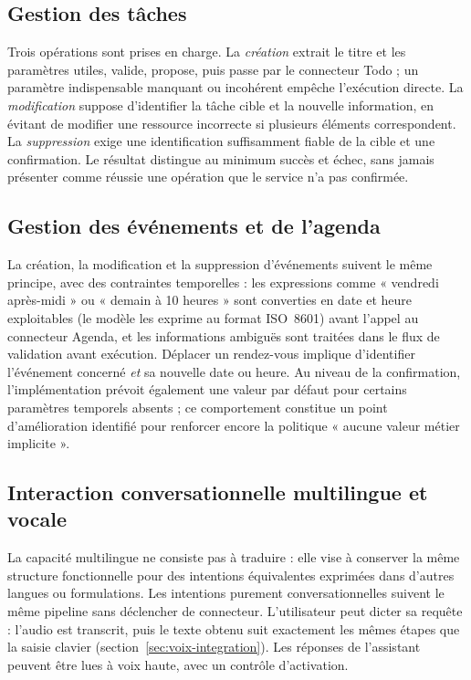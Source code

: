 \documentclass[11pt,a4paper,openany,oneside]{report}
\begin{document}
\subsection{Gestion des tâches}
Trois opérations sont prises en charge. La \emph{création} extrait le titre et les paramètres utiles, valide, propose, puis passe par le connecteur Todo ; un paramètre indispensable manquant ou incohérent empêche l'exécution directe. La \emph{modification} suppose d'identifier la tâche cible et la nouvelle information, en évitant de modifier une ressource incorrecte si plusieurs éléments correspondent. La \emph{suppression} exige une identification suffisamment fiable de la cible et une confirmation. Le résultat distingue au minimum succès et échec, sans jamais présenter comme réussie une opération que le service n'a pas confirmée.

\subsection{Gestion des événements et de l'agenda}
La création, la modification et la suppression d'événements suivent le même principe, avec des contraintes temporelles : les expressions comme « vendredi après-midi » ou « demain à 10 heures » sont converties en date et heure exploitables (le modèle les exprime au format ISO~8601) avant l'appel au connecteur Agenda, et les informations ambiguës sont traitées dans le flux de validation avant exécution. Déplacer un rendez-vous implique d'identifier l'événement concerné \emph{et} sa nouvelle date ou heure. Au niveau de la confirmation, l'implémentation prévoit également une valeur par défaut pour certains paramètres temporels absents ; ce comportement constitue un point d'amélioration identifié pour renforcer encore la politique « aucune valeur métier implicite ».

\subsection{Interaction conversationnelle multilingue et vocale}
La capacité multilingue ne consiste pas à traduire : elle vise à conserver la même structure fonctionnelle pour des intentions équivalentes exprimées dans d'autres langues ou formulations. Les intentions purement conversationnelles suivent le même pipeline sans déclencher de connecteur. L'utilisateur peut dicter sa requête : l'audio est transcrit, puis le texte obtenu suit exactement les mêmes étapes que la saisie clavier (section~\ref{sec:voix-integration}). Les réponses de l'assistant peuvent être lues à voix haute, avec un contrôle d'activation.
\end{document}
